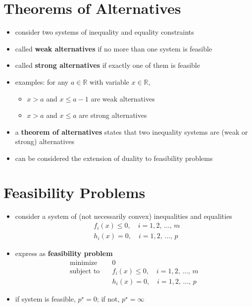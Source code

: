 \documentclass[11pt]{extarticle}
\newcommand{\ds}{\displaystyle}
\theoremstyle{definition}
\begin{document}
\newpage

\section*{Theorems of Alternatives}
\begin{itemize}
  \item consider two systems of inequality and equality constraints
  \item called {\bf weak alternatives} if no more than one system is feasible
  \item called {\bf strong alternatives} if exactly one of them is feasible
  \item examples: for any $a\in\mathbb{R}$ with variable $x\in\mathbb{R}$,
    \begin{itemize}
      \item $x > a$ and $x \leqslant a - 1$ are weak alternatives
      \item $x > a$ and $x \leqslant a$ are strong alternatives
    \end{itemize}
  \item a {\bf theorem of alternatives} states that two inequality systems are (weak or strong) alternatives
  \item can be considered the extension of duality to feasibility problems 
\end{itemize}

\newpage

\section*{Feasibility Problems}
\begin{itemize}
  \item consider a system of (not necessarily convex) inequalities and equalities 
    \begin{align*}
      &f_i(x)\leqslant 0, \quad i = 1, 2,\,\ldots,\,m \\
      &h_i(x) = 0, \quad i = 1, 2,\,\ldots,\,p 
    \end{align*}
  \item express as {\bf feasibility problem}
    \begin{align*}
      \text{minimize}\quad & 0 \\
      \text{subject to}\quad &f_i(x)\leqslant 0, \quad i = 1, 2,\,\ldots,\,m \\
      \qquad\qquad &h_i(x) = 0, \quad i = 1, 2,\,\ldots,\,p 
    \end{align*}
  \item if system is feasible, $\ds p^\star = 0$; if not, $\ds p^\star = \infty$
\end{itemize}
\end{document}

